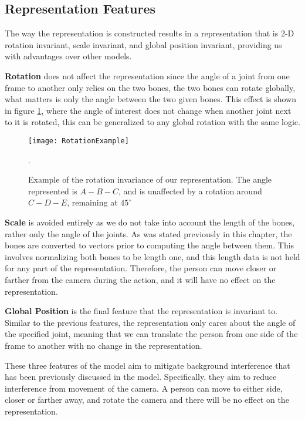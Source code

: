\subsection{Representation Features}

The way the representation is constructed results in a representation that is 2-D rotation invariant, scale invariant, and global position invariant, providing us with advantages over other models.

\textbf{Rotation} does not affect the representation since the angle of a joint from one frame to another only relies on the two bones, the two bones can rotate globally, what matters is only the angle between the two given bones. This effect is shown in figure \ref{fig:rotation-invariant}, where the angle of interest does not change when another joint next to it is rotated, this can be generalized to any global rotation with the same logic.

\begin{figure}[ht]
	\texttt{[image: RotationExample]}
	\centering
	\caption{Example of the rotation invariance of our representation. The angle represented is $A-B-C$, and is unaffected by a rotation around $C-D-E$, remaining at $45^{\circ}$}.
	\label{fig:rotation-invariant}
\end{figure}

\textbf{Scale} is avoided entirely as we do not take into account the length of the bones, rather only the angle of the joints. As was stated previously in this chapter, the bones are converted to vectors prior to computing the angle between them. This involves normalizing both bones to be length one, and this length data is not held for any part of the representation. Therefore, the person can move closer or farther from the camera during the action, and it will have no effect on the representation.

\textbf{Global Position} is the final feature that the representation is invariant to. Similar to the previous features, the representation only cares about the angle of the specified joint, meaning that we can translate the person from one side of the frame to another with no change in the representation.

These three features of the model aim to mitigate background interference that has been previously discussed in the model. Specifically, they aim to reduce interference from movement of the camera. A person can move to either side, closer or farther away, and rotate the camera  and there will be no effect on the representation.

